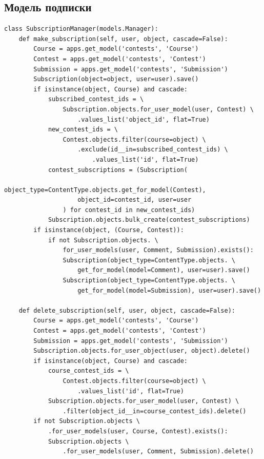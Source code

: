 \documentclass[12pt, a4paper, oneside]{article}
\begin{document}
\subsection{Модель подписки}
\begin{verbatim}
class SubscriptionManager(models.Manager):
    def make_subscription(self, user, object, cascade=False):
        Course = apps.get_model('contests', 'Course')
        Contest = apps.get_model('contests', 'Contest')
        Submission = apps.get_model('contests', 'Submission')
        Subscription(object=object, user=user).save()
        if isinstance(object, Course) and cascade:
            subscribed_contest_ids = \
                Subscription.objects.for_user_model(user, Contest) \
                    .values_list('object_id', flat=True)
            new_contest_ids = \
                Contest.objects.filter(course=object) \
                    .exclude(id__in=subscribed_contest_ids) \
                        .values_list('id', flat=True)
            contest_subscriptions = (Subscription(
                    object_type=ContentType.objects.get_for_model(Contest), 
                    object_id=contest_id, user=user
                ) for contest_id in new_contest_ids)
            Subscription.objects.bulk_create(contest_subscriptions)
        if isinstance(object, (Course, Contest)):
            if not Subscription.objects. \
                for_user_models(user, Comment, Submission).exists():
                Subscription(object_type=ContentType.objects. \
                    get_for_model(model=Comment), user=user).save()
                Subscription(object_type=ContentType.objects. \
                    get_for_model(model=Submission), user=user).save()
    
    def delete_subscription(self, user, object, cascade=False):
        Course = apps.get_model('contests', 'Course')
        Contest = apps.get_model('contests', 'Contest')
        Submission = apps.get_model('contests', 'Submission')
        Subscription.objects.for_user_object(user, object).delete()
        if isinstance(object, Course) and cascade:
            course_contest_ids = \
                Contest.objects.filter(course=object) \
                    .values_list('id', flat=True)
            Subscription.objects.for_user_model(user, Contest) \
                .filter(object_id__in=course_contest_ids).delete()
        if not Subscription.objects \
            .for_user_models(user, Course, Contest).exists():
            Subscription.objects \
                .for_user_models(user, Comment, Submission).delete()


\end{verbatim}
\end{document}
